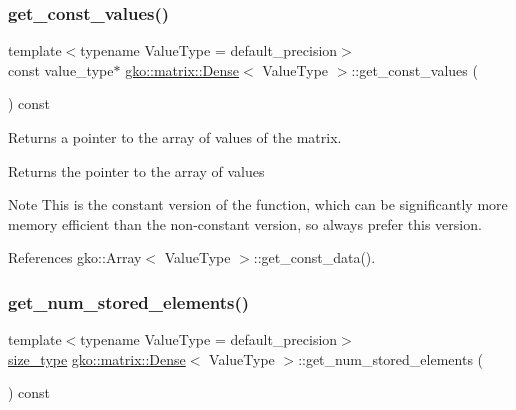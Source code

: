 \subsubsection{\texorpdfstring{get\+\_\+const\+\_\+values()}{get\_const\_values()}}
{\footnotesize\ttfamily template$<$typename Value\+Type = default\+\_\+precision$>$ \\
const value\+\_\+type$\ast$ \hyperlink{classgko_1_1matrix_1_1Dense}{gko\+::matrix\+::\+Dense}$<$ Value\+Type $>$\+::get\+\_\+const\+\_\+values (\begin{DoxyParamCaption}{ }\end{DoxyParamCaption}) const\hspace{0.3cm}{\ttfamily [noexcept]}}



Returns a pointer to the array of values of the matrix. 

\begin{DoxyReturn}{Returns}
the pointer to the array of values
\end{DoxyReturn}
\begin{DoxyNote}{Note}
This is the constant version of the function, which can be significantly more memory efficient than the non-\/constant version, so always prefer this version. 
\end{DoxyNote}


References gko\+::\+Array$<$ Value\+Type $>$\+::get\+\_\+const\+\_\+data().

\mbox{\label{classgko_1_1matrix_1_1Dense_a7a6ce578c683841591718134e1ccd1b9}} 
\subsubsection{\texorpdfstring{get\+\_\+num\+\_\+stored\+\_\+elements()}{get\_num\_stored\_elements()}}
{\footnotesize\ttfamily template$<$typename Value\+Type = default\+\_\+precision$>$ \\
\hyperlink{namespacegko_a6e5c95df0ae4e47aab2f604a22d98ee7}{size\+\_\+type} \hyperlink{classgko_1_1matrix_1_1Dense}{gko\+::matrix\+::\+Dense}$<$ Value\+Type $>$\+::get\+\_\+num\+\_\+stored\+\_\+elements (\begin{DoxyParamCaption}{ }\end{DoxyParamCaption}) const\hspace{0.3cm}{\ttfamily [noexcept]}}



